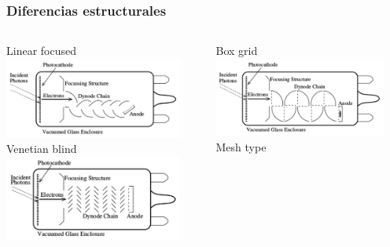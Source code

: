 \documentclass{beamer}
\begin{document}
\begin{frame}
\frametitle{Diferencias estructurales}
\begin{columns}
\begin{column}{0.3\textwidth}
\begin{center}
{\color{blue}Linear focused}
\includegraphics[height=0.3\textheight,width=0.9\textwidth]{d1/linear_focused_pmt} \\
{\color{blue}Venetian blind}
\includegraphics[height=0.3\textheight,width=0.9\textwidth]{d1/venetian_blind_pmt}
\end{center}
\end{column}
\begin{column}{0.3\textwidth}
\begin{center}
{\color{blue}Box grid}
\includegraphics[height=0.3\textheight,width=0.9\textwidth]{d1/box_grid_pmt} \\
{\color{blue}Mesh type}

\end{center}
\end{column}
\end{columns}
\end{frame}
\end{document}
